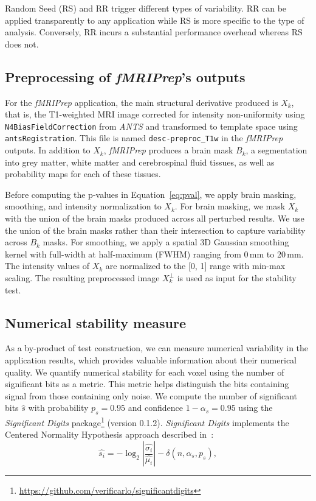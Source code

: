 \documentclass[lettersize,journal]{IEEEtran}
\newcommand{\fmriprep}{\emph{fMRIPrep}\xspace}
\newcommand{\fwhm}{\textsc{FWHM}}
\begin{document}
Random Seed (RS) and RR trigger different types of variability. RR can be
applied transparently to any application while RS is more specific to the type
of analysis. Conversely, RR incurs a substantial performance overhead whereas
RS does not.

\subsection{Preprocessing of \fmriprep's outputs}
\label{subsec:preprocessing}

For the \fmriprep application, the main structural derivative produced is
$X_k$, that is, the T1-weighted MRI image corrected for intensity
non-uniformity using \texttt{N4BiasFieldCorrection} from \emph{ANTS} and
transformed to template space using \texttt{antsRegistration}. This file is
named \texttt{desc-preproc\_T1w} in the \fmriprep outputs. In addition to
$X_k$, \fmriprep produces a brain mask $B_k$, a segmentation into grey matter,
white matter and cerebrospinal fluid tissues, as well as probability maps for
each of these tissues.

Before computing the p-values in Equation~\ref{eq:pval}, we apply brain
masking, smoothing, and intensity normalization to $X_k$. For brain masking, we
mask $X_k$ with the union of the brain masks produced across all perturbed
results. We use the union of the brain masks rather than their intersection to
capture variability across $B_k$ masks.
For smoothing, we apply a spatial 3D Gaussian smoothing kernel with full-width
at half-maximum (\fwhm) ranging from 0\,mm to 20\,mm. The intensity values of
$X_k$ are normalized to the [0, 1] range with min-max scaling. The resulting
preprocessed image $X_k^\perp$ is used as input for the stability test.

\subsection{Numerical stability measure}
\label{subsec:sigbits}

As a by-product of test construction, we can measure numerical variability in
the application results, which provides valuable information about their
numerical quality. We quantify numerical stability for each voxel using the
number of significant bits as a metric. This metric helps distinguish the bits
containing signal from those containing only noise. We compute the number of
significant bits $\hat{s}$ with probability $p_s=0.95$ and confidence
$1-\alpha_s=0.95$ using the \emph{Significant Digits}
package\footnote{\url{https://github.com/verificarlo/significantdigits}}
(version 0.1.2). \emph{Significant Digits} implements the Centered Normality
Hypothesis approach described in~\cite{sohier2021confidence}:
\[
  \hat{s_i} = -\log_2 \left| \frac{\hat{\sigma_i}}{\hat{\mu_i}} \right| - \delta(n, \alpha_s, p_s),
\]
\end{document}

